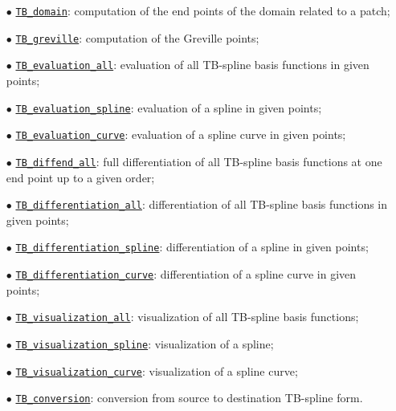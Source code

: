 \documentclass[10pt]{acmtrans2e}
\begin{document}
\begin{itemize}
  \item[$\bullet$] \hyperref[sec:matlab-tb-domain]{\texttt{TB\_domain}}: 
     computation of the end points of the domain related to a patch;
  \item[$\bullet$] \hyperref[sec:matlab-tb-greville]{\texttt{TB\_greville}}: 
     computation of the Greville points;
  \item[$\bullet$] \hyperref[sec:matlab-tb-evaluation-all]{\texttt{TB\_evaluation\_all}}: 
     evaluation of all TB-spline basis functions in given points;
  \item[$\bullet$] \hyperref[sec:matlab-tb-evaluation-spline]{\texttt{TB\_evaluation\_spline}}: 
     evaluation of a spline in given points;
  \item[$\bullet$] \hyperref[sec:matlab-tb-evaluation-curve]{\texttt{TB\_evaluation\_curve}}: 
     evaluation of a spline curve in given points;
  \item[$\bullet$] \hyperref[sec:matlab-tb-diffend-all]{\texttt{TB\_diffend\_all}}: 
     full differentiation of all TB-spline basis functions at one end point up to a given order;
  \item[$\bullet$] \hyperref[sec:matlab-tb-differentiation-all]{\texttt{TB\_differentiation\_all}}: 
     differentiation of all TB-spline basis functions in given points;
  \item[$\bullet$] \hyperref[sec:matlab-tb-differentiation-spline]{\texttt{TB\_differentiation\_spline}}: 
     differentiation of a spline in given points;
  \item[$\bullet$] \hyperref[sec:matlab-tb-differentiation-curve]{\texttt{TB\_differentiation\_curve}}: 
     differentiation of a spline curve in given points;
  \item[$\bullet$] \hyperref[sec:matlab-tb-visualization-all]{\texttt{TB\_visualization\_all}}: 
     visualization of all TB-spline basis functions;
  \item[$\bullet$] \hyperref[sec:matlab-tb-visualization-spline]{\texttt{TB\_visualization\_spline}}: 
     visualization of a spline;
  \item[$\bullet$] \hyperref[sec:matlab-tb-visualization-curve]{\texttt{TB\_visualization\_curve}}: 
     visualization of a spline curve;
  \item[$\bullet$] \hyperref[sec:matlab-tb-conversion]{\texttt{TB\_conversion}}: 
     conversion from source to destination TB-spline form.
\end{itemize}
\end{document}
